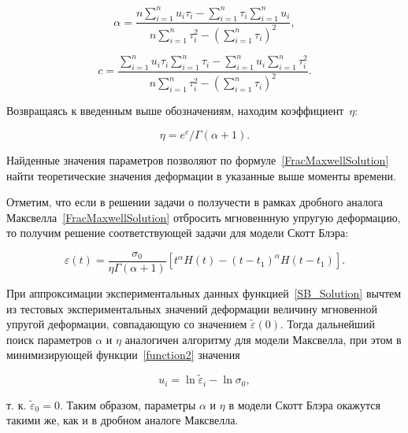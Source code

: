 \documentclass[11pt,a4paper,twoside]{article}
\begin{document}
$$\alpha=\frac{n\sum^{n}_{i=1}u_{i}\tau_{i}-\sum^{n}_{i=1}\tau_{i}\sum^{n}_{i=1}u_{i}}{n\sum^{n}_{i=1}\tau_{i}^{2}-\left(\sum^{n}_{i=1}\tau_{i}\right)^{2}},


$$


$$ 


c=\frac{\sum^{n}_{i=1}u_{i}\tau_{i}\sum^{n}_{i=1}\tau_{i}-\sum^{n}_{i=1}u_{i}\sum^{n}_{i=1}\tau_{i}^{2}}{n\sum^{n}_{i=1}\tau_{i}^{2}-\left(\sum^{n}_{i=1}\tau_{i}\right)^{2}}.


$$


Возвращаясь к введенным выше обозначениям, находим коэффициент~$\eta$:


$$


\eta={e^{c}}/{\Gamma(\alpha+1)}.


$$


Найденные значения параметров позволяют по формуле~\eqref{FracMaxwellSolution} найти теоретические значения деформации в указанные выше моменты времени.


 


Отметим, что если в решении задачи о ползучести в рамках дробного аналога Максвелла~\eqref{FracMaxwellSolution} отбросить мгновеннную упругую деформацию, то получим решение   соответствующей задачи для модели Скотт Блэра:


\begin{equation} \label{SB_Solution}


\varepsilon(t)=\frac{\sigma_{0}}{\eta\Gamma(\alpha+1)}[t^{\alpha}H(t)-(t-t_{1})^{\alpha}H(t-t_{1})].


\end{equation}


При аппроксимации экспериментальных данных функцией~\eqref{SB_Solution} вычтем из тестовых экспериментальных значений деформации величину мгновенной упругой деформации, совпадающую со значением $\tilde{\varepsilon}(0)$. Тогда дальнейший поиск параметров $\alpha$ и $\eta$ аналогичен алгоритму для модели Максвелла, при этом в минимизирующей функции~\eqref{function2} значения 


\begin{equation}\label{u_i}


u_{i}=\ln\tilde{\varepsilon}_{i}-\ln\sigma_{0},


\end{equation}  


т. к. $\tilde{\varepsilon}_{0}=0$. Таким образом, параметры $\alpha$ и $\eta$ в модели Скотт Блэра окажутся такими же, как и в дробном аналоге Максвелла.
\end{document}
